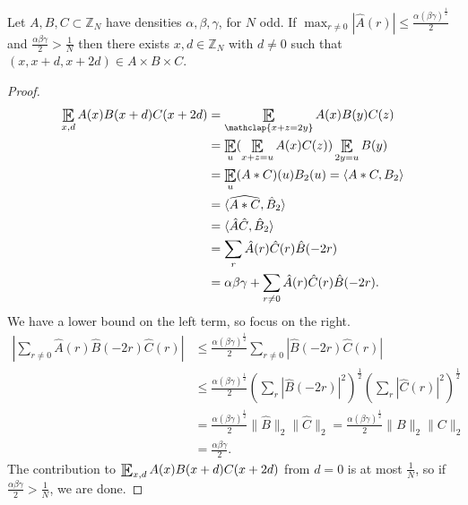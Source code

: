 \documentclass{article}
\DeclareMathOperator*{\E}{\scalerel*{\mathbb{E}}{\textstyle\sum}}
\newcommand{\1}[1]{\mathbbm{1}_{#1}}
\begin{document}
\begin{nlemma}
  Let $A, B, C \subset \mathbb{Z}_N$ have densities $\alpha, \beta, \gamma$, for $N$ odd.
  If $\max_{r \neq 0} |\hat{A}(r)| \leq \frac{\alpha(\beta \gamma)^\frac{1}{2}}{2}$ and $\frac{\alpha\beta\gamma}{2} > \frac{1}{N}$ then there exists $x,d \in \mathbb{Z}_N$ with $d \neq 0$ such that $(x, x+d, x+2d) \in A \times B \times C$.
\end{nlemma}
\begin{proof}
  \begin{align*}
    \E_{x,d} A(x) B(x+d) C(x+2d) &= \E_{\mathclap{x + z = 2y}} A(x) B(y) C(z) \\
                                 &= \E_u (\E_{x+z=u} A(x) C(z)) \E_{2y=u} B(y) \\
                                 &= \E_u (A * C)(u) B_2(u) = \langle A * C, B_2 \rangle \\
                                 &= \langle \widehat{A * C}, \hat{B} _2 \rangle \\
                                 &= \langle \hat{A} \hat{C}, \hat{B}_2 \rangle \\
                                 &= \sum_r \hat{A}(r) \hat{C}(r) \hat{B}(-2r) \\
                                 &= \alpha \beta \gamma + \sum_{r\neq 0} \hat{A}(r) \hat{C}(r) \hat{B}(-2r).
  \end{align*}
  We have a lower bound on the left term, so focus on the right.
  \begin{align*}
    \left| \sum_{r\neq0} \hat{A}(r) \hat{B}(-2r) \hat{C}(r) \right| &\leq \frac{\alpha(\beta\gamma)^\frac{1}{2}}{2} \sum_{r\neq0} |\hat{B}(-2r) \hat{C}(r)| \\
                                                      &\leq \frac{\alpha(\beta\gamma)^\frac{1}{2}}{2} \left(\sum_r |\hat{B}(-2r)|^2\right)^\frac{1}{2} \left(\sum_r |\hat{C}(r)|^2\right)^\frac{1}{2} \\
                                                      &= \frac{\alpha(\beta\gamma)^\frac{1}{2}}{2} \|\hat{B}\|_2 \|\hat{C}\|_2 = \frac{\alpha(\beta\gamma)^\frac{1}{2}}{2} \|B\|_2 \|C\|_2 \\
                                                      &= \frac{\alpha\beta\gamma}{2}.
  \end{align*}
  The contribution to $\E_{x,d} A(x) B(x+d) C(x+2d)$ from $d=0$ is at most $\frac{1}{N}$, so if $\frac{\alpha\beta\gamma}{2} > \frac{1}{N}$, we are done.
\end{proof}
\end{document}
